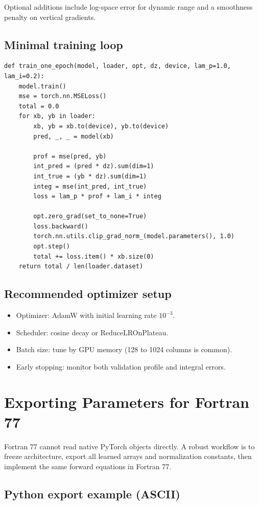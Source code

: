 \documentclass[11pt, a4paper]{article}
\begin{document}
Optional additions include log-space error for dynamic range and a smoothness penalty on vertical gradients.

\subsection{Minimal training loop}

\begin{verbatim}
def train_one_epoch(model, loader, opt, dz, device, lam_p=1.0, lam_i=0.2):
    model.train()
    mse = torch.nn.MSELoss()
    total = 0.0
    for xb, yb in loader:
        xb, yb = xb.to(device), yb.to(device)
        pred, _, _ = model(xb)

        prof = mse(pred, yb)
        int_pred = (pred * dz).sum(dim=1)
        int_true = (yb * dz).sum(dim=1)
        integ = mse(int_pred, int_true)
        loss = lam_p * prof + lam_i * integ

        opt.zero_grad(set_to_none=True)
        loss.backward()
        torch.nn.utils.clip_grad_norm_(model.parameters(), 1.0)
        opt.step()
        total += loss.item() * xb.size(0)
    return total / len(loader.dataset)
\end{verbatim}

\subsection{Recommended optimizer setup}
\begin{itemize}
    \item Optimizer: AdamW with initial learning rate $10^{-3}$.
    \item Scheduler: cosine decay or ReduceLROnPlateau.
    \item Batch size: tune by GPU memory (128 to 1024 columns is common).
    \item Early stopping: monitor both validation profile and integral errors.
\end{itemize}

\section{Exporting Parameters for Fortran 77}

Fortran 77 cannot read native PyTorch objects directly. A robust workflow is to freeze architecture, export all learned arrays and normalization constants, then implement the same forward equations in Fortran 77.

\subsection{Python export example (ASCII)}
\end{document}
